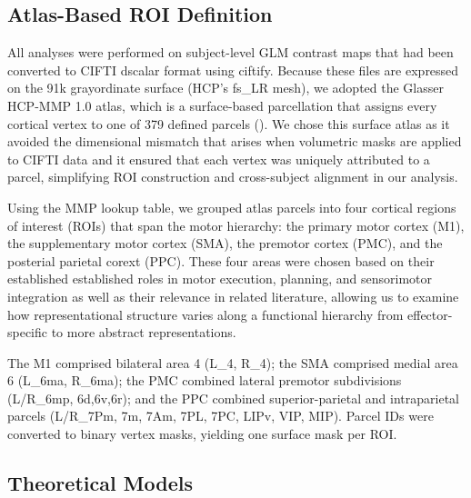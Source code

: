 \documentclass{article}
\begin{document}
\subsection{Atlas-Based ROI Definition}
All analyses were performed on subject-level GLM contrast maps that had been converted to CIFTI dscalar format using ciftify.  Because these files are expressed on the 91k grayordinate surface (HCP's fs_LR mesh), we adopted the Glasser HCP-MMP 1.0 atlas, which is a surface-based parcellation that assigns every cortical vertex to one of 379 defined parcels (\cite{atlas}). We chose this surface atlas as it avoided the dimensional mismatch that arises when volumetric masks are applied to CIFTI data and it ensured that each vertex was uniquely attributed to a parcel, simplifying ROI construction and cross-subject alignment in our analysis. 

Using the MMP lookup table, we grouped atlas parcels into four cortical regions of interest (ROIs) that span the motor hierarchy: the primary motor cortex (M1), the supplementary motor cortex (SMA), the premotor cortex (PMC), and the posterial parietal corext (PPC). These four areas were chosen based on their established established roles in motor execution, planning, and sensorimotor integration as well as their relevance in related literature, allowing us to examine how representational structure varies along a functional hierarchy from effector-specific to more abstract representations.

The M1 comprised bilateral area 4 (L_4, R_4); the SMA comprised medial area 6 (L_6ma, R_6ma); the PMC combined lateral premotor subdivisions (L/R_6mp, 6d,6v,6r); and the PPC combined superior-parietal and intraparietal parcels (L/R_7Pm, 7m, 7Am, 7PL, 7PC, LIPv, VIP, MIP). Parcel IDs were converted to binary vertex masks, yielding one surface mask per ROI.



 
\subsection{Theoretical Models}
\end{document}
